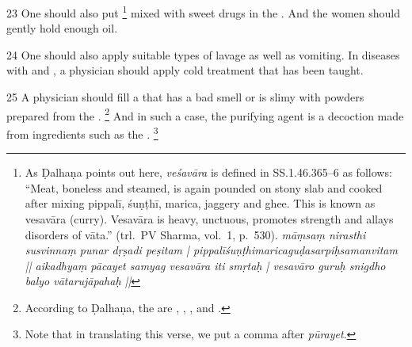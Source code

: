 \begin{translation}
\item [23]
One should also put %
	\footnote{%
	As Ḍalhaṇa points out here, \textit{veśavāra} is defined in SS.1.46.365--6 as follows: “Meat, boneless and steamed, is again pounded on stony slab and cooked after mixing pippalī, śuṇṭhī, marica, jaggery and ghee. This is known as vesavāra (curry). Vesavāra is heavy, unctuous, promotes strength and allays disorders of vāta.” (trl.\ PV Sharma, vol.\ 1, p.\ 530). 
	\textit{māṃsaṃ nirasthi susvinnaṃ punar dṛṣadi peṣitam | pippalīśuṇṭhimaricaguḍasarpiḥsamanvitam || aikadhyaṃ pācayet samyag vesavāra iti smṛtaḥ | vesavāro guruḥ snigdho balyo vātarujāpahaḥ ||}
	} 
mixed with sweet drugs in the . And the women should gently hold enough  oil.%

\item [24]
One should also apply suitable types of lavage as well as vomiting. 
In diseases with  and , a physician should apply cold treatment that has been taught.

\item [25]
A physician should fill a  that has a bad smell or is slimy with powders prepared from the .%
	\footnote{%
	According to Ḍalhaṇa, the  are , , ,  and .
	} 
And in such a case, the purifying agent is a decoction made from ingredients such as the .%
	\footnote{%
	Note that in translating this verse, we put a comma after \textit{pūrayet}.%
	}


\end{translation}

